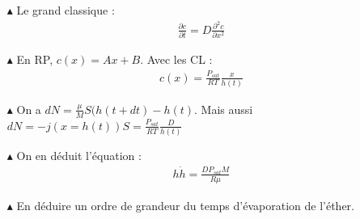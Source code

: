 \documentclass{report}
\begin{document}
\begin{itemize}

	\item[$\blacktriangle$] Le grand classique :
	\begin{align*}
		\frac{\partial c}{\partial t}= D\frac{\partial^2 c}{\partial x^2} 
	\end{align*}
	
	\item[$\blacktriangle$] En RP, $c(x)=Ax+B$. Avec les CL :
	\begin{align*}
		c(x)=\frac{P_{sat}}{RT}\frac{x}{h(t)}
	\end{align*}
	
	\item[$\blacktriangle$] On a $dN=\frac{\mu}{M}S(h(t+dt)-h(t)$. Mais aussi $dN=-j(x=h(t))S=\frac{P_{sat}}{RT}\frac{D}{h(t)}$
	
	\item[$\blacktriangle$] On en déduit l'équation :
	\begin{align*}
		h\dot{h}=\frac{DP_{sat}M}{R\mu}		
	\end{align*}
	
	\item[$\blacktriangle$] En déduire un ordre de grandeur du temps d'évaporation de l'éther.

\end{itemize}
\end{document}
